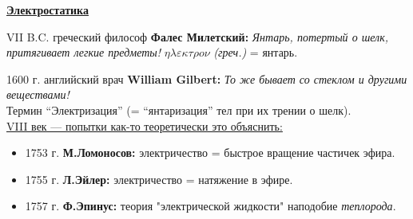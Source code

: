 \documentclass[12pt,epsfig,color,russian]{article}
\begin{document}
\sf\Large
\vspace*{-20mm}
 \centerline{\underline{\huge\bf Электростатика}}\vspace{5mm}

VII B.C. греческий философ {\bf Фалес Милетский:} {\sl Янтарь, потертый о шелк, притягивает легкие предметы!}
\hfill{ }\underline{$\eta\lambda\varepsilon\kappa\tau\rho o\nu$} {\em(греч.)} = янтарь.

1600 г. английский врач {\bf William Gilbert:} {\sl То же бывает со стеклом и другими веществами!}\\
Термин ``Электризация'' (= ``янтаризация'' тел при их трении о шелк).\\

\noindent\underline{VIII век --- попытки как-то теоретически это объяснить:}
\begin{itemize}
\item
1753 г. {\bf М.Ломоносов:} электричество = быстрое вращение частичек эфира.
\item
1755 г. {\bf Л.Эйлер:} электричество = натяжение в эфире.
\item
1757 г. {\bf Ф.Эпинус:} теория "электрической жидкости" наподобие {\sl теплорода}.
\end{itemize}
\end{document}

